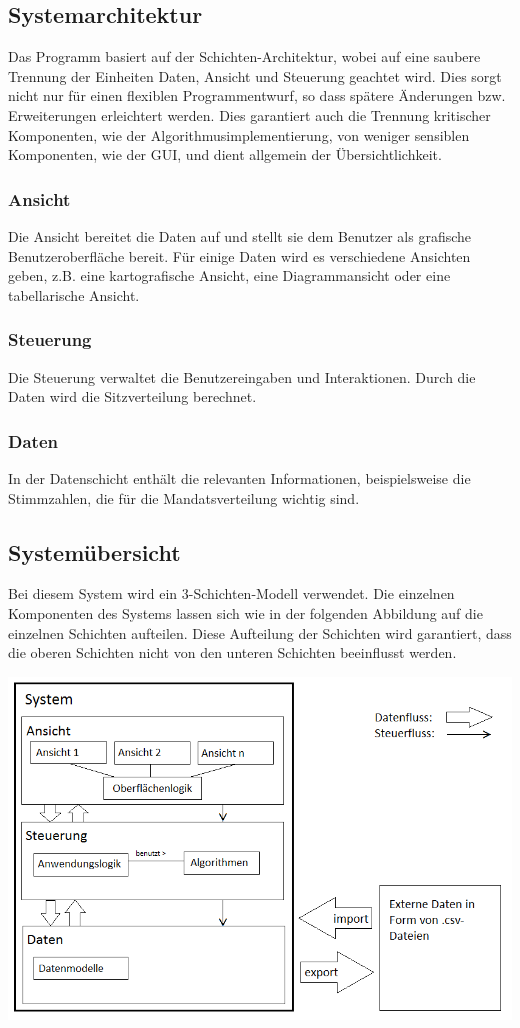 \documentclass[10pt,a4paper]{article}
\begin{document}
\subsection{Systemarchitektur}
Das Programm basiert auf der Schichten-Architektur, wobei auf eine saubere Trennung der Einheiten Daten, Ansicht und Steuerung geachtet wird. Dies sorgt nicht nur für einen flexiblen Programmentwurf, so dass spätere Änderungen bzw. Erweiterungen erleichtert werden. Dies garantiert auch die Trennung kritischer Komponenten, wie der Algorithmusimplementierung, von weniger sensiblen Komponenten, wie der GUI, und dient allgemein der Übersichtlichkeit.

\subsubsection{Ansicht}
Die Ansicht bereitet die Daten auf und stellt sie dem Benutzer als grafische Benutzeroberfläche bereit. Für einige Daten wird es verschiedene Ansichten geben, z.B. eine kartografische Ansicht, eine Diagrammansicht oder eine tabellarische Ansicht.

\subsubsection{Steuerung}
Die Steuerung verwaltet die Benutzereingaben und Interaktionen. Durch die Daten wird die Sitzverteilung berechnet.

\subsubsection{Daten}
In der Datenschicht enthält die relevanten Informationen, beispielsweise die Stimmzahlen, die für die Mandatsverteilung wichtig sind.

\subsection{Systemübersicht}
Bei diesem System wird ein 3-Schichten-Modell verwendet. Die einzelnen Komponenten des Systems lassen sich wie in der folgenden Abbildung auf die einzelnen Schichten aufteilen. Diese Aufteilung der Schichten wird garantiert, dass die oberen Schichten nicht von den unteren Schichten beeinflusst werden.

\includegraphics[scale=0.5]{Systemuebersicht2.png}
\end{document}
